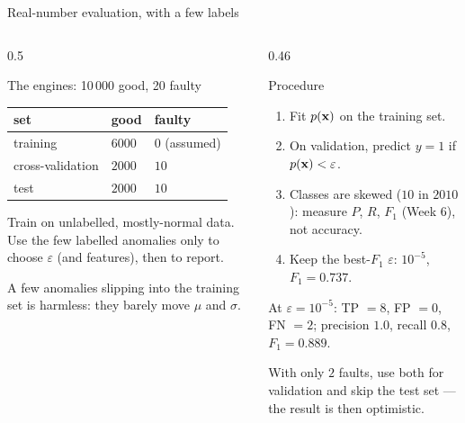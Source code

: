 \documentclass[aspectratio=169,10pt]{beamer}
\begin{document}
\begin{frame}{Real-number evaluation, with a few labels}
  \begin{columns}[T,onlytextwidth]
    \begin{column}{0.5\textwidth}
      \begin{block}{The engines: 10\,000 good, 20 faulty}
        \footnotesize
        \renewcommand{\arraystretch}{1.2}
        \begin{tabular}{@{}lll@{}}
          \toprule
          set & good & faulty\\
          \midrule
          training      & $6000$ & $0$ (assumed)\\
          cross-validation & $2000$ & $10$\\
          test          & $2000$ & $10$\\
          \bottomrule
        \end{tabular}\par
        \vspace{1mm}
        Train on unlabelled, mostly-normal data. Use the few labelled anomalies only to
        choose $\varepsilon$ (and features), then to report.
      \end{block}
      \footnotesize
      A few anomalies slipping into the training set is harmless: they barely move $\mu$
      and $\sigma$.
    \end{column}
    \begin{column}{0.46\textwidth}
      \footnotesize
      \begin{block}{Procedure}
        \begin{enumerate}
          \item Fit $p(\mathbf{x})$ on the training set.
          \item On validation, predict $y=1$ if $p(\mathbf{x})<\varepsilon$.
          \item Classes are skewed ($10$ in $2010$): measure $P$, $R$, $F_1$ (Week 6), not
                accuracy.
          \item Keep the best-$F_1$ $\varepsilon$: $10^{-5}$, $F_1=0.737$.
        \end{enumerate}
      \end{block}
      \begin{keyidea}
        At $\varepsilon=10^{-5}$: TP $=8$, FP $=0$, FN $=2$; precision
        $1.0$, recall $0.8$, $F_1=0.889$.
      \end{keyidea}
      \begin{pitfall}
        \footnotesize With only $2$ faults, use both for validation and skip the test set
        --- the result is then optimistic.
      \end{pitfall}
    \end{column}
  \end{columns}
\end{frame}
\end{document}
